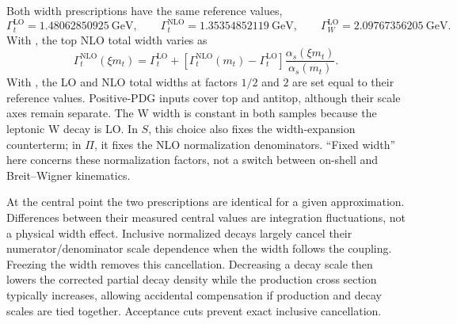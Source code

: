 \documentclass[11pt,a4paper]{article}
\newcommand{\code}[1]{\texttt{\detokenize{#1}}}
\begin{document}
Both width prescriptions have the same reference values,
\begin{equation}
 \Gamma_t^{\mathrm{LO}}=1.48062850925~\mathrm{GeV},\qquad
 \Gamma_t^{\mathrm{NLO}}=1.35354852119~\mathrm{GeV},\qquad
 \Gamma_W^{\mathrm{LO}}=2.09767356205~\mathrm{GeV}.
\end{equation}
With \code{AUTO}, the top NLO total width varies as
\begin{equation}
 \Gamma_t^{\mathrm{NLO}}(\xi m_t)=\Gamma_t^{\mathrm{LO}}+
 [\Gamma_t^{\mathrm{NLO}}(m_t)-\Gamma_t^{\mathrm{LO}}]
 \frac{\alpha_s(\xi m_t)}{\alpha_s(m_t)}.
\end{equation}
With \code{EXPLICIT}, the LO and NLO total widths at factors $1/2$ and $2$
are set equal to their reference values. Positive-PDG inputs cover top
and antitop, although their scale axes remain separate. The W width is
constant in both samples because the leptonic W decay is LO. In $S$, this
choice also fixes the width-expansion counterterm; in $\Pi$, it fixes the
NLO normalization denominators. ``Fixed width'' here concerns these
normalization factors, not a switch between on-shell and Breit--Wigner
kinematics.

At the central point the two prescriptions are identical for a given
approximation. Differences between their measured central values are
integration fluctuations, not a physical width effect. Inclusive
normalized decays largely cancel their numerator/denominator scale
dependence when the width follows the coupling. Freezing the width removes
this cancellation. Decreasing a decay scale then lowers the corrected
partial decay density while the production cross section typically
increases, allowing accidental compensation if production and decay scales
are tied together. Acceptance cuts prevent exact inclusive cancellation.
\end{document}
